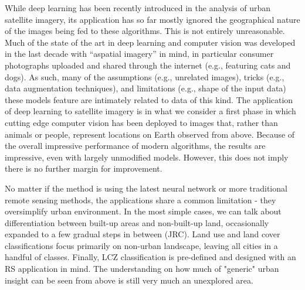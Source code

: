 

While deep learning has been recently introduced in the analysis of urban satellite
imagery, its application has so far mostly ignored the geographical nature of
the images being fed to these algorithms. This is not entirely unreasonable.
Much of the state of the art in deep learning and computer vision was
developed in the last decade with ``aspatial imagery'' in mind, in particular consumer
photographs uploaded and shared through the internet (e.g., featuring cats and
dogs). As such, many of the assumptions (e.g., unrelated images), tricks
(e.g., data augmentation techniques), and limitations (e.g., shape of the
input data) these models
feature are intimately related to data of this kind. The application of deep
learning to satellite imagery is in what we consider a first phase in which
cutting edge computer vision has been deployed to images that, rather than
animals or people, represent locations on Earth observed from above. Because
of the overall impressive performance of modern algorithms, the results are
impressive, even with largely unmodified models. However, this does not imply
there is no further margin for improvement.

No matter if the method is using the latest neural network or more traditional remote
sensing methods, the applications share a common limitation - they oversimplify urban
environment. In the most simple cases, we can talk about differentiation between
built-up areas and non-built-up land, occasionally expanded to a few gradual steps in
between (JRC). Land use and land cover classifications focus primarily on non-urban
landscape, leaving all cities in a handful of classes. Finally, LCZ classification is
pre-defined and designed with an RS application in mind. The understanding on how much
of "generic" urban insight can be seen from above is still very much an unexplored area.

